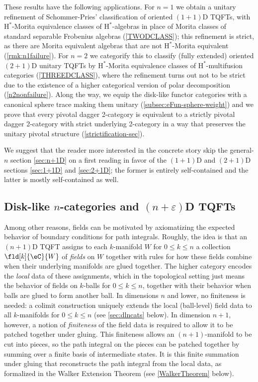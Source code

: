 \documentclass[12pt,reqno]{amsart}
\newcommand{\C}{\eC}
\newcommand{\e}{\varepsilon}
\newcommand{\Hstar}{\ensuremath{\mathrm{H}^{*}}}
\newcommand{\defn}[1]{\emph{#1}}
\begin{document}
These results have the following applications. For $n=1$ we obtain a unitary refinement of Schommer-Pries' classification of oriented $(1+1)$D TQFTs, with $\Hstar$-Morita equivalence classes of $\Hstar$-algebras in place of Morita classes of standard separable Frobenius algebras (\cref{TWODCLASS}); this refinement is strict, as there are Morita equivalent algebras that are not $\Hstar$-Morita equivalent (\cref{rmk:n1failure}). For $n=2$ we categorify this to classify (fully extended) oriented $(2+1)$D unitary TQFTs by $\Hstar$-Morita equivalence classes of $\Hstar$-multifusion categories (\cref{THREEDCLASS}), where the refinement turns out not to be strict due to the existence of a higher categorical version of polar decomposition (\cref{n2nonfailure}). Along the way, we equip the disk-like functor categories with a canonical sphere trace making them unitary (\cref{subsec:eFun-sphere-weight}) and we prove that every pivotal dagger 2-category is equivalent to a strictly pivotal dagger 2-category with strict underlying 2-category in a way that preserves the unitary pivotal structure (\cref{strictification-sec}).

We suggest that the reader more interested in the concrete story skip the general-$n$ section \cref{sec:n+1D} on a first reading in favor of the $(1+1)$D and $(2+1)$D sections \cref{sec:1+1D} and \cref{sec:2+1D}; the former is entirely self-contained and the latter is mostly self-contained as well.

\subsection{Disk-like \texorpdfstring{$n$}{n}-categories and \texorpdfstring{$(n+\e)$}{(n+e)}D TQFTs}

Among other reasons, fields can be motivated by axiomatizing the expected behavior of boundary conditions for path integrals. Roughly, the idea is that an $(n+1)$D TQFT assigns to each $k$-manifold $W$ for $0\leq k\leq n$ a collection $\fld[k]{\C}{W}$ of \defn{fields} on $W$ together with rules for how these fields combine when their underlying manifolds are glued together. The higher category encodes the \emph{local} data of these assignments, which in the topological setting just means the behavior of fields on $k$-balls for $0\leq k\leq n$, together with their behavior when balls are glued to form another ball. In dimensions $n$ and lower, no finiteness is needed: a colimit construction \cite[\S6.3]{MW12} uniquely extends the local (ball-level) field data to all $k$-manifolds for $0\leq k\leq n$ (see \cref{sec:dlncats} below). In dimension $n+1$, however, a notion of \emph{finiteness} of the field data is required to allow it to be patched together under gluing. This finiteness allows an $(n+1)$-manifold to be cut into pieces, so the path integral on the pieces can be patched together by summing over a finite basis of intermediate states. It is this finite summation under gluing that reconstructs the path integral from the local data, as formalized in the Walker Extension Theorem \cite{W06,W21} (see \cref{WalkerTheorem} below). 
\end{document}
